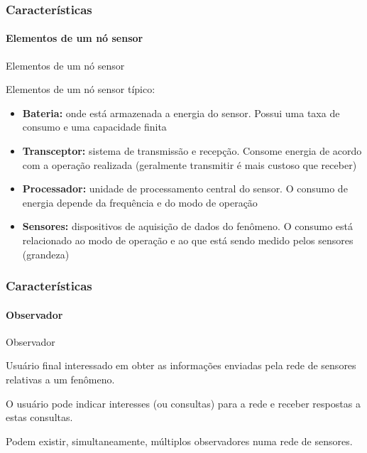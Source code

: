 \documentclass[notes]{beamer}
\begin{document}
\begin{frame}
\label{slide_13}
\frametitle{Características}
\framesubtitle{Elementos de um nó sensor}

\begin{block}{Elementos de um nó sensor}

Elementos de um nó sensor típico: \pause

\begin{itemize}

\item \textbf{Bateria:} onde está armazenada a energia do sensor. Possui uma taxa de consumo e uma capacidade finita \pause

\item \textbf{Transceptor:} sistema de transmissão e recepção. Consome energia de acordo com a operação realizada (geralmente transmitir é mais custoso que receber) \pause

\item \textbf{Processador:} unidade de processamento central do sensor. O consumo de energia depende da frequência e do modo de operação \pause

\item \textbf{Sensores:} dispositivos de aquisição de dados do fenômeno. O consumo está relacionado ao modo de operação e ao que está sendo medido pelos sensores (grandeza) 

\end{itemize}

\end{block}

\end{frame}

\begin{frame}
\label{slide_14}
\frametitle{Características}
\framesubtitle{Observador}

\begin{block}{Observador}

Usuário final interessado em obter as informações enviadas pela rede de sensores relativas a um fenômeno. 
\end{block}

\begin{block}

O usuário pode indicar interesses (ou consultas) para a rede e receber respostas a estas consultas. 
\end{block}

\begin{block}

Podem existir, simultaneamente, múltiplos observadores numa rede de sensores.
\end{block}

\end{frame}
\end{document}

